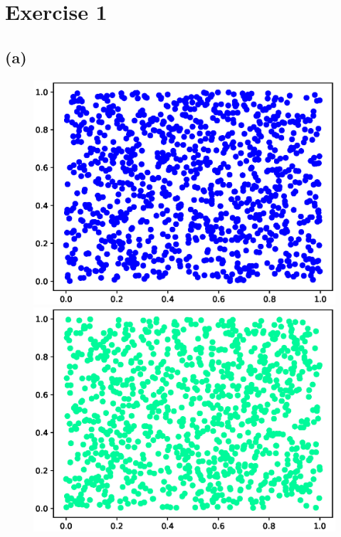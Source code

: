 \documentclass[12pt]{article}
\begin{document}
\section*{Exercise 1}

\subsection*{(a)}
\begin{figure}[h]
\centering
\begin{minipage}{0.47\textwidth}
    \includegraphics[width=1.2\textwidth]{figures/mt19937.eps}
\end{minipage}
\hfill
\begin{minipage}{0.47\textwidth}
    \includegraphics[width=1.2\textwidth]{figures/builtin.eps}
\end{minipage}
\end{figure}
\end{document}
